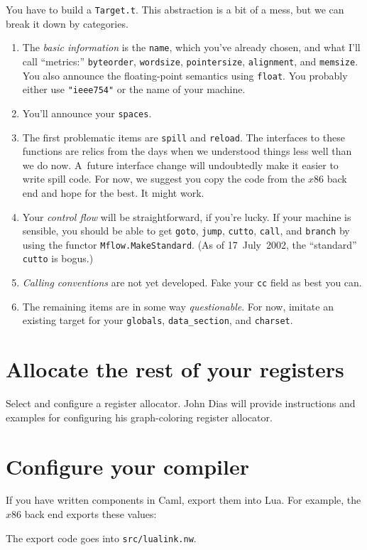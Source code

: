 \documentclass[12pt]{article}
\begin{document}
You have to build a \texttt{Target.t}.
This abstraction is a bit of a mess, but we can break it down by
categories. 
\begin{enumerate} 
\item
The \emph{basic information} is the \texttt{name}, which you've already
chosen, and what I'll call ``metrics:''
\texttt{byteorder}, \texttt{wordsize}, \texttt{pointersize},
\texttt{alignment}, and \texttt{memsize}.
You also announce the floating-point semantics using \texttt{float}.
You probably either use \texttt{"ieee754"} or the name of your
machine. 
\item
You'll announce your \texttt{spaces}.
\item
The first problematic items are \texttt{spill} and \texttt{reload}.
The interfaces to these functions are relics from the days when we
understood things less well than we do now.
A~future interface change will undoubtedly make it easier to write
spill code.
For now, we suggest you copy the code from the $x$86 back end and hope
for the best.
It might work.
\item
Your \emph{control flow} will be straightforward, if you're lucky.
If your machine is sensible, 
you should be able to get \texttt{goto}, \texttt{jump},
\texttt{cutto}, \texttt{call}, and \texttt{branch} by using the functor
\texttt{Mflow.MakeStandard}. 
(As of 17~July~2002, the ``standard'' \texttt{cutto} is bogus.)
\item
\emph{Calling conventions} are not yet developed.
Fake your \texttt{cc} field as best you can.
\item
The remaining items are in some way \emph{questionable}.
For now, imitate an existing target for your \texttt{globals},
\texttt{data\_section}, and \texttt{charset}.
\end{enumerate}


\section{Allocate the rest of your registers}

Select and configure a register allocator.
John Dias will provide instructions and examples for configuring his
graph-coloring register allocator.

\section{Configure your compiler}

If you have written components in Caml, export them into Lua.
For example, the $x$86 back end exports these values:\\
The export code goes into \texttt{src/lualink.nw}.
\end{document}
